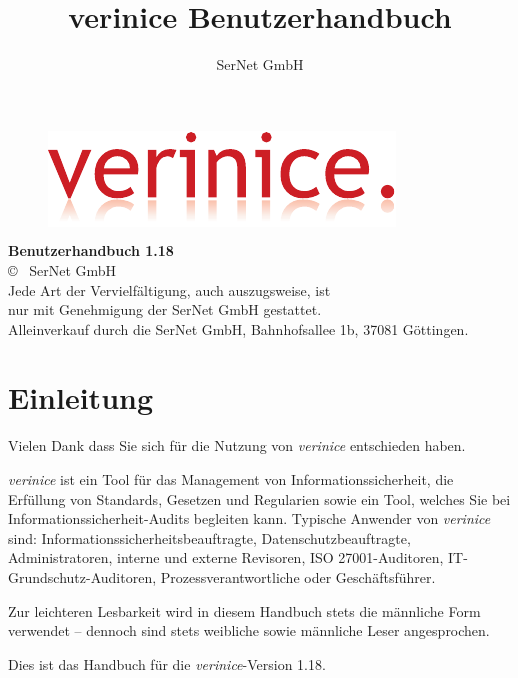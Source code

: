 \documentclass[a4paper,10pt]{book}
\title{verinice Benutzerhandbuch \vnversion{}}
\author{SerNet GmbH}
\newcommand*{\vnversion}{1.18}
\begin{document}

\begin{titlepage}
  \centering
  \vspace{1cm}
  \begin{figure}[htb!]
    \centering
    \colorbox{white}{\includegraphics{Image/logo.pdf}}
  \end{figure}
  \huge\textbf{Benutzerhandbuch \vnversion{}}\\
  \small
  \vspace{13.5cm}
  \copyright{} \the\year\ SerNet GmbH\\
  Jede Art der Vervielfältigung, auch auszugsweise, ist\\
  nur mit Genehmigung der SerNet GmbH gestattet.\\
  Alleinverkauf durch die SerNet GmbH, Bahnhofsallee 1b, 37081 Göttingen.
  \normalsize
\end{titlepage}

\tableofcontents

\listoftables

\listoffigures


\chapter{Einleitung}


Vielen Dank dass Sie sich für die Nutzung von \textit{verinice} entschieden
haben.

\textit{verinice} ist ein Tool für das Management von Informationssicherheit,
die Erfüllung von Standards, Gesetzen und Regularien sowie ein Tool, welches Sie
bei Informationssicherheit-Audits begleiten kann. Typische Anwender von
\textit{verinice} sind: Informationssicherheitsbeauftragte,
Datenschutzbeauftragte, Administratoren, interne und externe Revisoren, ISO
27001-Auditoren, IT-Grundschutz-Auditoren, Prozessverantwortliche oder
Geschäftsführer.

Zur leichteren Lesbarkeit wird in diesem Handbuch stets die männliche Form
verwendet – dennoch sind stets weibliche sowie männliche Leser angesprochen.

Dies ist das Handbuch für die \textit{verinice}-Version \vnversion{}.
\end{document}
